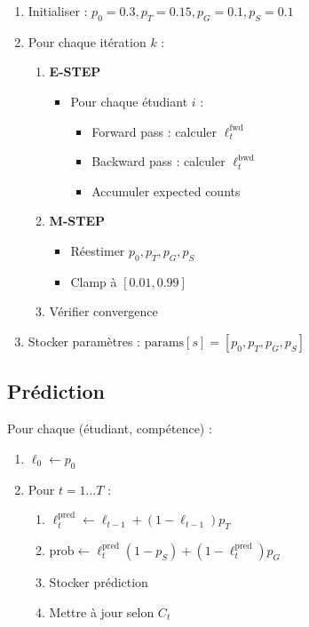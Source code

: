 \documentclass[12pt]{article}
\begin{document}
\begin{enumerate}
    \item Initialiser : $p_0 = 0.3, p_T = 0.15, p_G = 0.1, p_S = 0.1$

    \item Pour chaque itération $k$ :
          \begin{enumerate}
              \item \textbf{E-STEP}
                    \begin{itemize}
                        \item Pour chaque étudiant $i$ :
                              \begin{itemize}
                                  \item Forward pass : calculer $\ell_t^{\text{fwd}}$
                                  \item Backward pass : calculer $\ell_t^{\text{bwd}}$
                                  \item Accumuler expected counts
                              \end{itemize}
                    \end{itemize}

              \item \textbf{M-STEP}
                    \begin{itemize}
                        \item Réestimer $p_0, p_T, p_G, p_S$
                        \item Clamp à $[0.01, 0.99]$
                    \end{itemize}

              \item Vérifier convergence
          \end{enumerate}

    \item Stocker paramètres : $\text{params}[s] = [p_0, p_T, p_G, p_S]$
\end{enumerate}

\subsection{Prédiction}

Pour chaque (étudiant, compétence) :

\begin{enumerate}
    \item $\ell_0 \leftarrow p_0$
    \item Pour $t = 1 \ldots T$ :
          \begin{enumerate}
              \item $\ell_t^{\text{pred}} \leftarrow \ell_{t-1} + (1-\ell_{t-1})p_T$
              \item $\text{prob} \leftarrow \ell_t^{\text{pred}}(1-p_S) + (1-\ell_t^{\text{pred}})p_G$
              \item Stocker prédiction
              \item Mettre à jour selon $C_t$
          \end{enumerate}
\end{enumerate}
\end{document}
